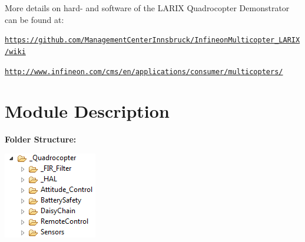 More details on hard-\/ and software of the L\+A\+R\+IX Quadrocopter Demonstrator can be found at\+:
\begin{DoxyItemize}
\item \href{https://github.com/ManagementCenterInnsbruck/InfineonMulticopter_LARIX/wiki}{\tt https\+://github.\+com/\+Management\+Center\+Innsbruck/\+Infineon\+Multicopter\+\_\+\+L\+A\+R\+I\+X/wiki}
\item \href{http://www.infineon.com/cms/en/applications/consumer/multicopters/}{\tt http\+://www.\+infineon.\+com/cms/en/applications/consumer/multicopters/}
\end{DoxyItemize}\hypertarget{index_moduleDescription}{}\section{Module Description}\label{index_moduleDescription}
{\bfseries  Folder Structure\+: }  
\begin{DoxyImageNoCaption}
  \mbox{\includegraphics[width=\textwidth,height=\textheight/2,keepaspectratio=true]{FolderStructure.PNG}}
\end{DoxyImageNoCaption}



